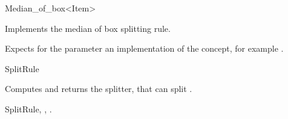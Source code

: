 

\begin{ccRefFunctionObjectClass}{Median_of_box<Item>}  %


\ccDefinition
Implements the median of box splitting rule.


\ccParameters

Expects for the parameter  an implementation of the
 concept, for example .

\ccIsModel

SplitRule

\ccTypes


\ccCreation
{}  %



{Computes and returns the splitter, that can split .}

\ccSeeAlso

SplitRule,
,
.

\end{ccRefFunctionObjectClass}


